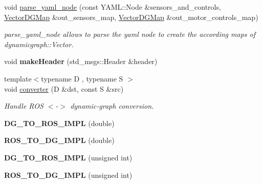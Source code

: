 \begin{DoxyCompactItemize}
void \hyperlink{namespacedynamic__graph_a3473e2d5502f8a2bff6b43cbc2d35e07}{parse\+\_\+yaml\+\_\+node} (const Y\+A\+M\+L\+::\+Node \&sensors\+\_\+and\+\_\+controls, \hyperlink{namespacedynamic__graph_abd184187f3bc15df5e227d866529e4a7}{Vector\+D\+G\+Map} \&out\+\_\+sensors\+\_\+map, \hyperlink{namespacedynamic__graph_abd184187f3bc15df5e227d866529e4a7}{Vector\+D\+G\+Map} \&out\+\_\+motor\+\_\+controls\+\_\+map)
\begin{DoxyCompactList}\small\item\em parse\+\_\+yaml\+\_\+node allows to parse the yaml node to create the according maps of dynamicgraph\+::\+Vector. \end{DoxyCompactList}\item 
\mbox{\label{namespacedynamic__graph_a7932709c47f2977a4478bd6f035ee12b}} 
void {\bfseries make\+Header} (std\+\_\+msgs\+::\+Header \&header)
\item 
{\footnotesize template$<$typename D , typename S $>$ }\\void \hyperlink{namespacedynamic__graph_aa00932c9efb8a607efd6997386d78680}{converter} (D \&dst, const S \&src)
\begin{DoxyCompactList}\small\item\em Handle R\+OS $<$-\/$>$ dynamic-\/graph conversion. \end{DoxyCompactList}\item 
\mbox{\label{namespacedynamic__graph_a22ff0d85472d1b606719f789a73224c3}} 
{\bfseries D\+G\+\_\+\+T\+O\+\_\+\+R\+O\+S\+\_\+\+I\+M\+PL} (double)
\item 
\mbox{\label{namespacedynamic__graph_a8487bee8650edee2dabb3c21662f411f}} 
{\bfseries R\+O\+S\+\_\+\+T\+O\+\_\+\+D\+G\+\_\+\+I\+M\+PL} (double)
\item 
\mbox{\label{namespacedynamic__graph_a894a6396a849e5a251f807e42f160c28}} 
{\bfseries D\+G\+\_\+\+T\+O\+\_\+\+R\+O\+S\+\_\+\+I\+M\+PL} (unsigned int)
\item 
\mbox{\label{namespacedynamic__graph_afd65ab6689e1cc46f28c0c6e365f0ff6}} 
{\bfseries R\+O\+S\+\_\+\+T\+O\+\_\+\+D\+G\+\_\+\+I\+M\+PL} (unsigned int)
\item 
\mbox{\label{namespacedynamic__graph_ac2a5616ba0bc2168c574b16fb4512b1c}} 

\end{DoxyCompactItemize}
